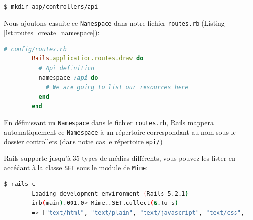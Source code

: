 \documentclass[]{report}
\begin{document}
      \begin{scriptsize}
      \begin{lstlisting}[language=bash, caption={Commande pour créer le dossier controllers/api}, label={lst:mkdir_controllers_api}]
      $ mkdir app/controllers/api
      \end{lstlisting}
      \end{scriptsize}

      Nous ajoutons ensuite ce \verb|Namespace| dans notre fichier \verb|routes.rb| (Listing \ref{lst:routes_create_namespace}):

      \begin{scriptsize}
        \begin{lstlisting}[language=ruby, caption={Création d'un Namespace}, label={lst:routes_create_namespace}]
        # config/routes.rb
        Rails.application.routes.draw do
          # Api definition
          namespace :api do
            # We are going to list our resources here
          end
        end
        \end{lstlisting}
      \end{scriptsize}

      En définissant un \verb|Namespace| dans le fichier \verb|routes.rb|, Rails mappera automatiquement ce \verb|Namespace| à un répertoire correspondant au nom sous le dossier controllers (dans notre cas le répertoire \verb|api/|).

      Rails supporte jusqu'à 35 types de médias différents, vous pouvez les lister en accédant à la classe \verb|SET| sous le module de \verb|Mime|:

      \begin{scriptsize}
        \begin{lstlisting}[language=bash]
        $ rails c
        Loading development environment (Rails 5.2.1)
        irb(main):001:0> Mime::SET.collect(&:to_s)
        => ["text/html", "text/plain", "text/javascript", "text/css", "text/calendar", "text/csv", "text/vcard", "text/vtt", "image/png", "image/jpeg", "image/gif", "image/bmp", "image/tiff", "image/svg+xml", "video/mpeg", "audio/mpeg", "audio/ogg", "audio/aac", "video/webm", "video/mp4", "font/otf", "font/ttf", "font/woff", "font/woff2", "application/xml", "application/rss+xml", "application/atom+xml", "application/x-yaml", "multipart/form-data", "application/x-www-form-urlencoded", "application/json", "application/pdf", "application/zip", "application/gzip", "application/vnd.web-console.v2"]
        \end{lstlisting}
      \end{scriptsize}
\end{document}
